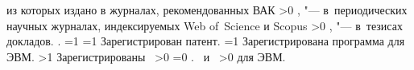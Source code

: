 {\begin{refsection}
             из которых издано в журналах, рекомендованных ВАК%
        \ifnum \value{citeauthorscopuswos}>0%
            ,  "--- в~периодических научных журналах, индексируемых Web of~Science и Scopus%
        \fi%
        \ifnum \value{citeauthorconf}>0%
            ,  "--- в~тезисах докладов.
        \else%
            .
        \fi%
        \ifnum \value{citeregistered}=1%
            \ifnum \value{citeauthorpatent}=1%
                Зарегистрирован  патент.
            \fi%
            \ifnum \value{citeauthorprogram}=1%
                Зарегистрирована  программа для ЭВМ.
            \fi%
        \fi%
        \ifnum \value{citeregistered}>1%
            Зарегистрированы\ %
            \ifnum \value{citeauthorpatent}>0%
                \ifnum \value{citeauthorprogram}=0 . \else \ и~\fi%
            \fi%
            \ifnum \value{citeauthorprogram}>0%
                 для ЭВМ.
            \fi%
        \fi%
    \end{refsection}%
    \begin{refsection}
    \end{refsection}%
}


